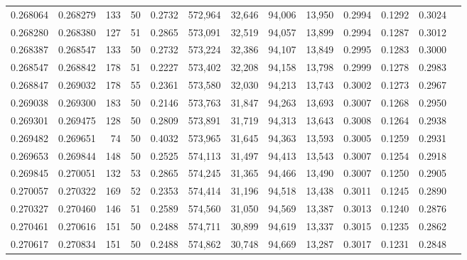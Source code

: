 \begin{tabular}{rrrrrrrrrrrrr}
0.268064 & 0.268279 &   133 &  50 &                                     0.2732 & 572,964 &  32,646 &  94,006 &  13,950 & 0.2994 & 0.1292 & 0.3024 \\
0.268280 & 0.268380 &   127 &  51 &                                     0.2865 & 573,091 &  32,519 &  94,057 &  13,899 & 0.2994 & 0.1287 & 0.3012 \\
0.268387 & 0.268547 &   133 &  50 &                                     0.2732 & 573,224 &  32,386 &  94,107 &  13,849 & 0.2995 & 0.1283 & 0.3000 \\
0.268547 & 0.268842 &   178 &  51 &                                     0.2227 & 573,402 &  32,208 &  94,158 &  13,798 & 0.2999 & 0.1278 & 0.2983 \\
0.268847 & 0.269032 &   178 &  55 &                                     0.2361 & 573,580 &  32,030 &  94,213 &  13,743 & 0.3002 & 0.1273 & 0.2967 \\
0.269038 & 0.269300 &   183 &  50 &                                     0.2146 & 573,763 &  31,847 &  94,263 &  13,693 & 0.3007 & 0.1268 & 0.2950 \\
0.269301 & 0.269475 &   128 &  50 &                                     0.2809 & 573,891 &  31,719 &  94,313 &  13,643 & 0.3008 & 0.1264 & 0.2938 \\
0.269482 & 0.269651 &    74 &  50 &                                     0.4032 & 573,965 &  31,645 &  94,363 &  13,593 & 0.3005 & 0.1259 & 0.2931 \\
0.269653 & 0.269844 &   148 &  50 &                                     0.2525 & 574,113 &  31,497 &  94,413 &  13,543 & 0.3007 & 0.1254 & 0.2918 \\
0.269845 & 0.270051 &   132 &  53 &                                     0.2865 & 574,245 &  31,365 &  94,466 &  13,490 & 0.3007 & 0.1250 & 0.2905 \\
0.270057 & 0.270322 &   169 &  52 &                                     0.2353 & 574,414 &  31,196 &  94,518 &  13,438 & 0.3011 & 0.1245 & 0.2890 \\
0.270327 & 0.270460 &   146 &  51 &                                     0.2589 & 574,560 &  31,050 &  94,569 &  13,387 & 0.3013 & 0.1240 & 0.2876 \\
0.270461 & 0.270616 &   151 &  50 &                                     0.2488 & 574,711 &  30,899 &  94,619 &  13,337 & 0.3015 & 0.1235 & 0.2862 \\
0.270617 & 0.270834 &   151 &  50 &                                     0.2488 & 574,862 &  30,748 &  94,669 &  13,287 & 0.3017 & 0.1231 & 0.2848 \\

\end{tabular}
